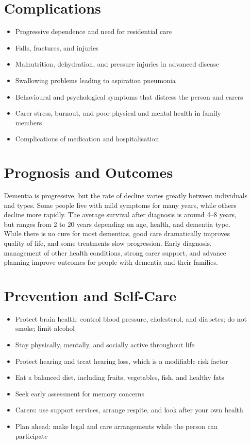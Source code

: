 \section*{Complications}
\begin{itemize}
    \item Progressive dependence and need for residential care
    \item Falls, fractures, and injuries
    \item Malnutrition, dehydration, and pressure injuries in advanced disease
    \item Swallowing problems leading to aspiration pneumonia
    \item Behavioural and psychological symptoms that distress the person and carers
    \item Carer stress, burnout, and poor physical and mental health in family members
    \item Complications of medication and hospitalisation
\end{itemize}

\section*{Prognosis and Outcomes}
Dementia is progressive, but the rate of decline varies greatly between individuals and types. Some people live with mild symptoms for many years, while others decline more rapidly. The average survival after diagnosis is around 4--8 years, but ranges from 2 to 20 years depending on age, health, and dementia type. While there is no cure for most dementias, good care dramatically improves quality of life, and some treatments slow progression. Early diagnosis, management of other health conditions, strong carer support, and advance planning improve outcomes for people with dementia and their families.

\section*{Prevention and Self-Care}
\begin{itemize}
    \item Protect brain health: control blood pressure, cholesterol, and diabetes; do not smoke; limit alcohol
    \item Stay physically, mentally, and socially active throughout life
    \item Protect hearing and treat hearing loss, which is a modifiable risk factor
    \item Eat a balanced diet, including fruits, vegetables, fish, and healthy fats
    \item Seek early assessment for memory concerns
    \item Carers: use support services, arrange respite, and look after your own health
    \item Plan ahead: make legal and care arrangements while the person can participate
\end{itemize}

